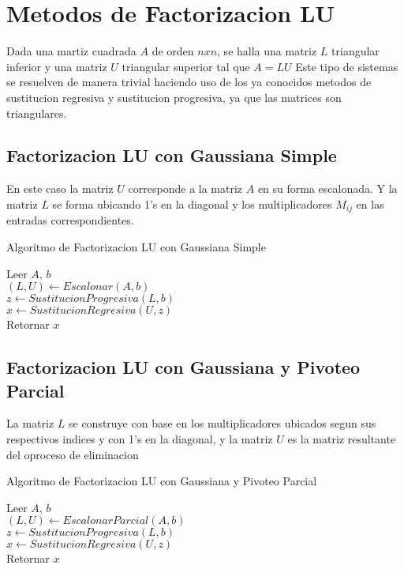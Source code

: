 \documentclass[12pt]{article}
\begin{document}
        \section{Metodos de Factorizacion LU}
        Dada una martiz cuadrada $A$ de orden $n x n$, se halla una matriz $L$
        triangular inferior y una matriz $U$ triangular superior tal que $A = LU$
        Este tipo de sistemas se resuelven de manera trivial haciendo uso de los ya conocidos
        metodos de sustitucion regresiva y sustitucion progresiva, ya que las matrices son
        triangulares.

        \subsection{Factorizacion LU con Gaussiana Simple}
        En este caso la matriz $U$ corresponde a la matriz $A$ en su forma escalonada. Y la matriz $L$ se forma ubicando 1's en la diagonal y los multiplicadores $M_{ij}$ en las entradas correspondientes.
        
        \begin{algorithm}[H]
            \caption{Algoritmo de Factorizacion LU con Gaussiana Simple}
            Leer $A$, $b$ \\
            $(L, U) \leftarrow Escalonar(A, b)$\\ 
            $z \leftarrow SustitucionProgresiva(L, b)$\\
            $x \leftarrow SustitucionRegresiva(U, z)$\\
            Retornar $x$\\
        \end{algorithm}

        \subsection{Factorizacion LU con Gaussiana y Pivoteo Parcial}
        La matriz $L$ se construye con base en los multiplicadores ubicados segun sus respectivos indices y con 1's en la diagonal, y la matriz $U$ es la matriz resultante del oproceso de eliminacion 
        
        \begin{algorithm}[H]
            \caption{Algoritmo de Factorizacion LU con Gaussiana y Pivoteo Parcial}
            Leer $A$, $b$ \\
            $(L, U) \leftarrow EscalonarParcial(A, b)$\\
            $z \leftarrow SustitucionProgresiva(L, b)$\\
            $x \leftarrow SustitucionRegresiva(U, z)$\\
            Retornar $x$\\
        \end{algorithm}
\end{document}

